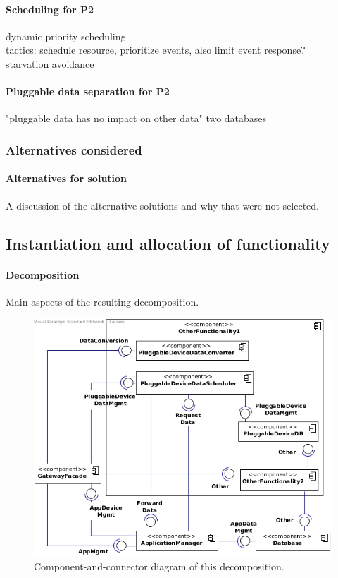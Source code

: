     \paragraph{Scheduling for P2}
        dynamic priority scheduling \\
        tactics: schedule resource, prioritize events, also limit event response?\\
        starvation avoidance

    \paragraph{Pluggable data separation for P2}
        "pluggable data has no impact on other data"
        two databases

    \subsubsection{Alternatives considered}
        \paragraph{Alternatives for solution}
            A discussion of the alternative solutions and why that were not selected.


\subsection{Instantiation and allocation of functionality}
    \paragraph{Decomposition}
        Main aspects of the resulting decomposition.

        \begin{figure}[!htp]
        	\centering
            \includegraphics[width=1.00\textwidth]{component-diagram-2}
        	\caption{Component-and-connector diagram of this decomposition.}
            \label{fig:it1-cc_main}
        \end{figure}

